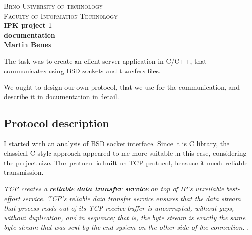 \documentclass[10pt,a4paper,titlepage]{article}
\begin{document}
\begin{titlepage}

\begin{center}
\textsc{\LARGE Brno University of technology}\\[0.5cm]
\textsc{\large Faculty of Information Technology}\\[8cm]

{ \huge \bfseries IPK project 1}\\[0.3cm]
{ \Large \bfseries documentation}\\[0.5cm]
{ \bfseries Martin Benes}\\

\end{center}

\end{titlepage}
\newpage




The task was to create an client-server application in C/C++, that communicates
using BSD sockets and transfers files.

We ought to design our own protocol, that we use for the communication, and
describe it in documentation in detail.

\subsection*{Protocol description}

I started with an analysis of BSD socket interface. Since it is C library,
the classical C-style approach appeared to me more suitable in this case,
considering the project size. The~protocol is built on TCP protocol,
because it needs reliable transmission.

{\it TCP creates a {\bf reliable data transfer service} on top of IP's unreliable
best-effort service. TCP's reliable data transfer service ensures that the
data stream that process reads out of its TCP receive buffer is uncorrupted,
without gaps, without duplication, and in sequence; that is, the byte stream
is exactly the same byte stream that was sent by the end system on the other
side of the connection.} \cite[p.~238]{computernetworking}.
\end{document}
